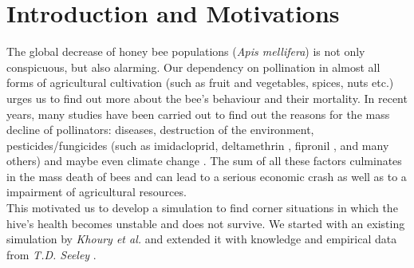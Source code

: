 \section{Introduction and Motivations}
The global decrease of honey bee populations (\textit{Apis mellifera}) is not only conspicuous, but also alarming. Our dependency on pollination in almost all forms of agricultural cultivation (such as fruit and vegetables, spices, nuts etc.) urges us to find out more about the bee's behaviour and their mortality. In recent years, many studies \cite{potts10} \cite{thomann13} have been carried out to find out the reasons for the mass decline of pollinators: diseases, destruction of the environment, pesticides/fungicides (such as imidacloprid, deltamethrin \cite{decourtye04}, fipronil \cite{bernadou09}, and many others) and maybe even climate change \cite{schweiger10}. The sum of all these factors culminates in the mass death of bees and can lead to a serious economic crash as well as to a impairment of agricultural resources.\\
This motivated us to develop a simulation to find corner situations in which the hive's health becomes unstable and does not survive. We started with an existing simulation by \textit{Khoury et al.} \cite{khoury13} and extended it with knowledge and empirical data from \textit{T.D. Seeley} \cite{seeley95}.